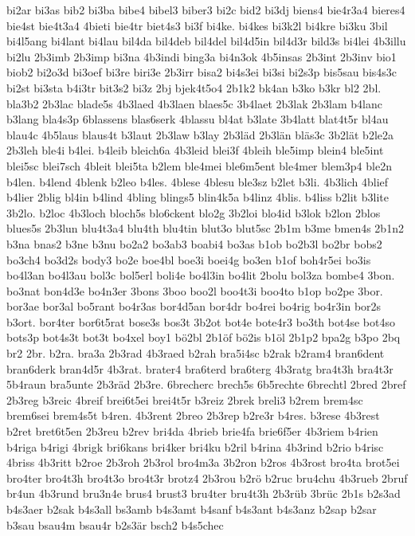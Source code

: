 {bi2ar
bi3as
bib2
bi3ba
bibe4
bibel3
biber3
bi2c
bid2
bi3dj
biens4
bie4r3a4
bieres4
bie4st
bie4t3a4
4bieti
bie4tr
biet4s3
bi3f
bi4ke.
bi4kes
bi3k2l
bi4kre
bi3ku
3bil
bi4l5ang
bi4lant
bi4lau
bil4da
bil4deb
bil4del
bil4d5in
bil4d3r
bild3s
bi4lei
4b3illu
bi2lu
2b3imb
2b3imp
bi3na
4b3indi
bing3a
bi4n3ok
4b5insas
2b3int
2b3inv
bio1
biob2
bi2o3d
bi3oef
bi3re
biri3e
2b3irr
bisa2
bi4s3ei
bi3si
bi2s3p
bis5sau
bis4s3c
bi2st
bi3sta
b4i3tr
bit3s2
bi3z
2bj
bjek4t5o4
2b1k2
bk4an
b3ko
b3kr
bl2
2bl.
bla3b2
2b3lac
blade5s
4b3laed
4b3laen
blaes5c
3b4laet
2b3lak
2b3lam
b4lanc
b3lang
bla4s3p
6blassens
blas6serk
4blassu
bl4at
b3late
3b4latt
blat4t5r
bl4au
blau4c
4b5laus
blaus4t
b3laut
2b3law
b3lay
2b3läd
2b3län
bläs3c
3b2lät
b2le2a
2b3leh
ble4i
b4lei.
b4leib
bleich6a
4b3leid
blei3f
4bleih
ble5imp
blein4
ble5int
blei5sc
blei7sch
4bleit
blei5ta
b2lem
ble4mei
ble6m5ent
ble4mer
blem3p4
ble2n
b4len.
b4lend
4blenk
b2leo
b4les.
4blese
4blesu
ble3sz
b2let
b3li.
4b3lich
4blief
b4lier
2blig
bl4in
b4lind
4bling
blings5
blin4k5a
b4linz
4blis.
b4liss
b2lit
b3lite
3b2lo.
b2loc
4b3loch
bloch5s
blo6ckent
blo2g
3b2loi
blo4id
b3lok
b2lon
2blos
blues5s
2b3lun
blu4t3a4
blu4th
blu4tin
blut3o
blut5sc
2b1m
b3me
bmen4s
2b1n2
b3na
bnas2
b3ne
b3nu
bo2a2
bo3ab3
boabi4
bo3as
b1ob
bo2b3l
bo2br
bobs2
bo3ch4
bo3d2s
body3
bo2e
boe4bl
boe3i
boei4g
bo3en
b1of
boh4r5ei
bo3is
bo4l3an
bo4l3au
bol3c
bol5erl
boli4e
bo4l3in
bo4lit
2bolu
bol3za
bombe4
3bon.
bo3nat
bon4d3e
bo4n3er
3bons
3boo
boo2l
boo4t3i
boo4to
b1op
bo2pe
3bor.
bor3ae
bor3al
bo5rant
bo4r3as
bor4d5an
bor4dr
bo4rei
bo4rig
bo4r3in
bor2s
b3ort.
bor4ter
bor6t5rat
bose3s
bos3t
3b2ot
bot4e
bote4r3
bo3th
bot4se
bot4so
bots3p
bot4s3t
bot3t
bo4xel
boy1
bö2bl
2b1öf
bö2is
b1öl
2b1p2
bpa2g
b3po
2bq
br2
2br.
b2ra.
bra3a
2b3rad
4b3raed
b2rah
bra5i4sc
b2rak
b2ram4
bran6dent
bran6derk
bran4d5r
4b3rat.
brater4
bra6terd
bra6terg
4b3ratg
bra4t3h
bra4t3r
5b4raun
bra5unte
2b3räd
2b3re.
6brecherc
brech5s
6b5rechte
6brechtl
2bred
2bref
2b3reg
b3reic
4breif
brei6t5ei
brei4t5r
b3reiz
2brek
breli3
b2rem
brem4sc
brem6sei
brem4s5t
b4ren.
4b3rent
2breo
2b3rep
b2re3r
b4res.
b3rese
4b3rest
b2ret
bret6t5en
2b3reu
b2rev
bri4da
4brieb
brie4fa
brie6f5er
4b3riem
b4rien
b4riga
b4rigi
4brigk
bri6kans
bri4ker
bri4ku
b2ril
b4rina
4b3rind
b2rio
b4risc
4briss
4b3ritt
b2roe
2b3roh
2b3rol
bro4m3a
3b2ron
b2ros
4b3rost
bro4ta
brot5ei
bro4ter
bro4t3h
bro4t3o
bro4t3r
brotz4
2b3rou
b2rö
b2ruc
bru4chu
4b3rueb
2bruf
br4un
4b3rund
bru3n4e
brus4
brust3
bru4ter
bru4t3h
2b3rüb
3brüc
2b1s
b2s3ad
b4s3aer
b2sak
b4s3all
bs3amb
b4s3amt
b4sanf
b4s3ant
b4s3anz
b2sap
b2sar
b3sau
bsau4m
bsau4r
b2s3är
bsch2
b4s5chec
}
